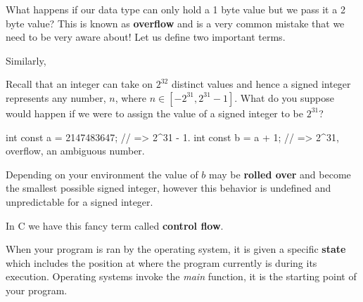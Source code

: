 What happens if our data type can only hold a 1 byte value but we pass it a 2 byte value? This is known as \textbf{overflow} and is a very common mistake that we need to be very aware about! Let us define two important terms.\\


Similarly,\\


Recall that an integer can take on $2^{32}$ distinct values and hence a signed integer represents any number, $n$, where $n \in [-2^{31}, 2^{31} - 1]$. What do you suppose would happen if we were to assign the value of a signed integer to be $2^{31}$?\\


\begin{code}[c]
int const a = 2147483647; // => 2^31 - 1.
int const b = a + 1; // => 2^31, overflow, an ambiguous number.
\end{code}

Depending on your environment the value of $b$ may be \textbf{rolled over} and become the smallest possible signed integer, however this behavior is undefined and unpredictable for a signed integer.\\





In C we have this fancy term called \textbf{control flow}.\\


When your program is ran by the operating system, it is given a specific \textbf{state} which includes the position at where the program currently is during its execution. Operating systems invoke the \emph{main} function, it is the starting point of your program.\\

